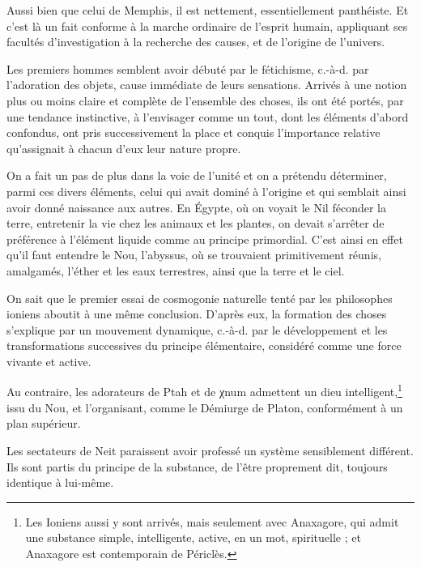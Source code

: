 \documentclass[letterpaper,twocolumn,openany,nodeprecatedcode]{dndbook}
\begin{document}
Aussi bien que celui de Memphis, il est nettement, essentiellement panthéiste. Et c'est là un fait conforme à la marche ordinaire de l'esprit humain, appliquant ses facultés d'investigation à la recherche des causes, et de l'origine de l'univers.

Les premiers hommes semblent avoir débuté par le fétichisme, c.-à-d. par l'adoration des objets, cause immédiate de leurs sensations. Arrivés à une notion plus ou moins claire et complète de l'ensemble des choses, ils ont été portés, par une tendance instinctive, à l'envisager comme un tout, dont les éléments d'abord confondus, ont pris successivement la place et conquis l'importance relative qu'assignait à chacun d'eux leur nature propre.

On a fait un pas de plus dans la voie de l'unité et on a prétendu déterminer, parmi ces divers éléments, celui qui avait dominé à l'origine et qui semblait ainsi avoir donné naissance aux autres. En Égypte, où on voyait le Nil féconder la terre, entretenir la vie chez les animaux et les plantes, on devait s'arrêter de préférence à l'élément liquide comme au principe primordial. C'est ainsi en effet qu'il faut entendre le Nou, l'abyssus, où se trouvaient primitivement réunis, amalgamés, l'éther et les eaux terrestres, ainsi que la terre et le ciel.

On sait que le premier essai de cosmogonie naturelle tenté par les philosophes ioniens aboutit à une même conclusion. D'après eux, la formation des choses s'explique par un mouvement dynamique, c.-à-d. par le développement et les transformations successives du principe élémentaire, considéré comme une force vivante et active.

Au contraire, les adorateurs de Ptah et de χnum admettent un dieu intelligent,\footnote{Les Ioniens aussi y sont arrivés, mais seulement avec Anaxagore, qui admit une substance simple, intelligente, active, en un mot, spirituelle ; et Anaxagore est contemporain de Périclès.} issu du Nou, et l'organisant, comme le Démiurge de Platon, conformément à un plan supérieur.

Les sectateurs de Neit paraissent avoir professé un système sensiblement différent. Ils sont partis du principe de la substance, de l'être proprement dit, toujours identique à lui-même.
\end{document}
